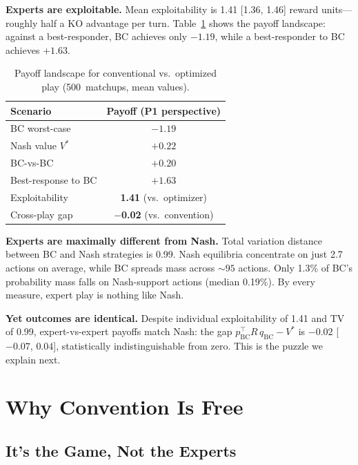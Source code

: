 \documentclass{article}
\begin{document}
\textbf{Experts are exploitable.} Mean exploitability is 1.41 [1.36, 1.46] reward units---roughly half a KO advantage per turn. Table~\ref{tab:triangle} shows the payoff landscape: against a best-responder, BC achieves only $-1.19$, while a best-responder to BC achieves $+1.63$.

\begin{table}[t]
\caption{Payoff landscape for conventional vs.\ optimized play (500~matchups, mean values).}
\label{tab:triangle}
\vskip 0.1in
\centering
\small
\begin{tabular}{lc}
\toprule
Scenario & Payoff (P1 perspective) \\
\midrule
BC worst-case & $-1.19$ \\
Nash value $V^*$ & $+0.22$ \\
BC-vs-BC & $+0.20$ \\
Best-response to BC & $+1.63$ \\
\midrule
Exploitability & \textbf{1.41} (vs.\ optimizer) \\
Cross-play gap & \textbf{$-$0.02} (vs.\ convention) \\
\bottomrule
\end{tabular}
\vskip -0.1in
\end{table}

\textbf{Experts are maximally different from Nash.} Total variation distance between BC and Nash strategies is 0.99. Nash equilibria concentrate on just 2.7 actions on average, while BC spreads mass across ${\sim}95$ actions. Only 1.3\% of BC's probability mass falls on Nash-support actions (median 0.19\%). By every measure, expert play is nothing like Nash.

\textbf{Yet outcomes are identical.} Despite individual exploitability of 1.41 and TV of 0.99, expert-vs-expert payoffs match Nash: the gap $p_\text{BC}^\top R\, q_\text{BC} - V^*$ is $-0.02$ [$-0.07$, $0.04$], statistically indistinguishable from zero. This is the puzzle we explain next.

\section{Why Convention Is Free}
\label{sec:free}

\subsection{It's the Game, Not the Experts}
\end{document}
